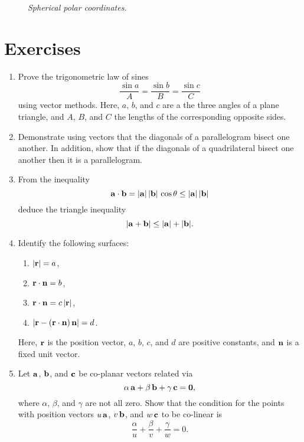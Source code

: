 \begin{figure}
\epsfysize=2.5in
\centerline{}
\caption{\em Spherical polar coordinates.}\label{fsph}
\end{figure}

\section{Exercises}
{\small 
\renewcommand{\theenumi}{2.\arabic{enumi}}
\begin{enumerate}
\item Prove the trigonometric law of sines 
$$
\frac{\sin a}{A} = \frac{\sin b}{B} = \frac{\sin c}{C}
$$
using vector methods. Here, $a$, $b$, and $c$ are a the three
angles of a plane triangle, and $A$, $B$, and $C$ the lengths of the corresponding opposite sides.

\item Demonstrate using vectors that the diagonals of a parallelogram bisect one another. In addition, show  that if the diagonals of a quadrilateral bisect one another then it is a parallelogram.

\item From the inequality
$$
{\bf a}\cdot{\bf b}= |{\bf a}|\,|{\bf b}|\,\cos\theta\leq |{\bf a}|\,|{\bf b}|
$$
deduce the triangle inequality
$$
|{\bf a} + {\bf b}|\leq |{\bf a}|+|{\bf b}|.
$$

\item Identify the following surfaces:
\begin{enumerate}
\item $|{\bf r}| = a$,
\item ${\bf r}\cdot{\bf n} = b$,
\item ${\bf r}\cdot{\bf n} = c\,|{\bf r}|$,
\item $|{\bf r} -({\bf r}\cdot{\bf n})\,{\bf n}| = d$.
\end{enumerate}
Here, ${\bf r}$ is the position vector, $a$, $b$,  $c$, and $d$ are positive
constants, and ${\bf n}$ is a fixed unit vector.

\item Let ${\bf a}$, ${\bf b}$, and ${\bf c}$ be co-planar vectors related via
$$
\alpha\,{\bf a} + \beta\,{\bf b} + \gamma\,{\bf c} = {\bf 0},
$$
where $\alpha$, $\beta$, and $\gamma$ are not all zero. Show that the condition
for the points with position vectors $u\,{\bf a}$, $v\,{\bf b}$,
and $w\,{\bf c}$ to be co-linear is
$$
\frac{\alpha}{u} +\frac{\beta}{v} + \frac{\gamma}{w} = 0.
$$


\end{enumerate}}
